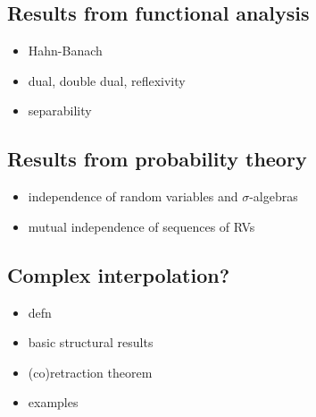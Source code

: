 \subsection{Results from functional analysis}

\begin{itemize}
\item Hahn-Banach
\item dual, double dual, reflexivity
\item separability
\end{itemize}

\subsection{Results from probability theory}

\begin{itemize}
\item independence of random variables and $\sigma$-algebras
\item mutual independence of sequences of RVs
\end{itemize}

\subsection{Complex interpolation?}

\begin{itemize}
\item defn
\item basic structural results
\item (co)retraction theorem
\item examples 
\end{itemize}


